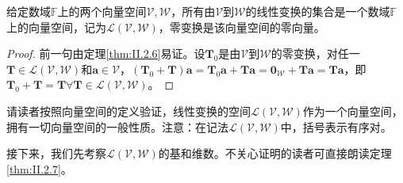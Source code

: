 \documentclass[main.tex]{subfiles}
\begin{document}
\begin{corollary}
    给定数域$\mathbb{F}$上的两个向量空间$\mathcal{V},\mathcal{W}$，所有由$\mathcal{V}$到$\mathcal{W}$的线性变换的集合是一个数域$\mathbb{F}$上的向量空间，记为$\mathcal{L}\left(\mathcal{V},\mathcal{W}\right)$，零变换是该向量空间的零向量。
\end{corollary}
\begin{proof}
    前一句由定理\ref{thm:II.2.6}易证。设$\mathbf{T}_0$是由$\mathcal{V}$到$\mathcal{W}$的零变换，对任一$\mathbf{T}\in\mathcal{L}\left(\mathcal{V},\mathcal{W}\right)$和$\mathbf{a}\in\mathcal{V}$，$\left(\mathbf{T}_0+\mathbf{T}\right)\mathbf{a}=\mathbf{T}_0\mathbf{a}+\mathbf{Ta}=\mathbf{0}_{\mathcal{W}}+\mathbf{Ta}=\mathbf{Ta}$，即$\mathbf{T}_0+\mathbf{T}=\mathbf{T}\forall\mathbf{T}\in\mathcal{L}\left(\mathcal{V},\mathcal{W}\right)$。
\end{proof}

请读者按照向量空间的定义验证，线性变换的空间$\mathcal{L}\left(\mathcal{V},\mathcal{W}\right)$作为一个向量空间，拥有一切向量空间的一般性质。注意：在记法$\mathcal{L}\left(\mathcal{V},\mathcal{W}\right)$中，括号表示有序对。

接下来，我们先考察$\mathcal{L}\left(\mathcal{V},\mathcal{W}\right)$的基和维数。不关心证明的读者可直接朗读定理\ref{thm:II.2.7}。
\end{document}
